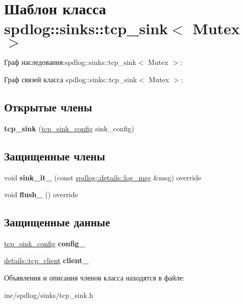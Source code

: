 \hypertarget{classspdlog_1_1sinks_1_1tcp__sink}{}\section{Шаблон класса spdlog\+:\+:sinks\+:\+:tcp\+\_\+sink$<$ Mutex $>$}
\label{classspdlog_1_1sinks_1_1tcp__sink}


Граф наследования\+:spdlog\+:\+:sinks\+:\+:tcp\+\_\+sink$<$ Mutex $>$\+:


Граф связей класса spdlog\+:\+:sinks\+:\+:tcp\+\_\+sink$<$ Mutex $>$\+:
\subsection*{Открытые члены}
\begin{DoxyCompactItemize}
\item 
\mbox{\label{classspdlog_1_1sinks_1_1tcp__sink_a0216b18f4bd37742c2e19236a5c0c916}} 
{\bfseries tcp\+\_\+sink} (\hyperlink{structspdlog_1_1sinks_1_1tcp__sink__config}{tcp\+\_\+sink\+\_\+config} sink\+\_\+config)
\end{DoxyCompactItemize}
\subsection*{Защищенные члены}
\begin{DoxyCompactItemize}
\item 
\mbox{\label{classspdlog_1_1sinks_1_1tcp__sink_a64e2d5e1426d11359479a4e9126da132}} 
void {\bfseries sink\+\_\+it\+\_\+} (const \hyperlink{structspdlog_1_1details_1_1log__msg}{spdlog\+::details\+::log\+\_\+msg} \&msg) override
\item 
\mbox{\label{classspdlog_1_1sinks_1_1tcp__sink_acb8ff5d52fe921500bf42d0b54f423f9}} 
void {\bfseries flush\+\_\+} () override
\end{DoxyCompactItemize}
\subsection*{Защищенные данные}
\begin{DoxyCompactItemize}
\item 
\mbox{\label{classspdlog_1_1sinks_1_1tcp__sink_ab0fb88fa9f04241f3d423b62800e0de8}} 
\hyperlink{structspdlog_1_1sinks_1_1tcp__sink__config}{tcp\+\_\+sink\+\_\+config} {\bfseries config\+\_\+}
\item 
\mbox{\label{classspdlog_1_1sinks_1_1tcp__sink_afc5b3878cddfb53c78004096725c9346}} 
\hyperlink{classspdlog_1_1details_1_1tcp__client}{details\+::tcp\+\_\+client} {\bfseries client\+\_\+}
\end{DoxyCompactItemize}


Объявления и описания членов класса находятся в файле\+:\begin{DoxyCompactItemize}
\item 
inc/spdlog/sinks/tcp\+\_\+sink.\+h\end{DoxyCompactItemize}
